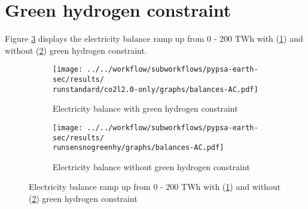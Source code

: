 \section{Green hydrogen constraint}

Figure \ref{fig:barplotscons} displays the electricity balance ramp up from 0 - 200 TWh with (\ref{fig:balances_AC_monthlymatch}) and without (\ref{fig:balances_AC_nogreen}) green hydrogen constraint.


\begin{figure}[h!]
    \centering
    \begin{subfigure}[b]{\linewidth}
        \centering
        \texttt{[image: ../../workflow/subworkflows/pypsa-earth-sec/results/\\runstandard/co2l2.0-only/graphs/balances-AC.pdf]}
        \caption{Electricity balance with green hydrogen constraint}
        \label{fig:balances_AC_monthlymatch}
    \end{subfigure}
    
    \vspace{0.5cm} %
    
    \begin{subfigure}[b]{\linewidth}
        \centering
        \texttt{[image: ../../workflow/subworkflows/pypsa-earth-sec/results/\\runsensnogreenhy/graphs/balances-AC.pdf]}
        \caption{Electricity balance without green hydrogen constraint}
        \label{fig:balances_AC_nogreen}
    \end{subfigure}
    
    \caption{Electricity balance ramp up from 0 - 200 TWh with (\ref{fig:balances_AC_monthlymatch}) and without (\ref{fig:balances_AC_nogreen}) green hydrogen constraint}
    \label{fig:barplotscons}
\end{figure}

\clearpage